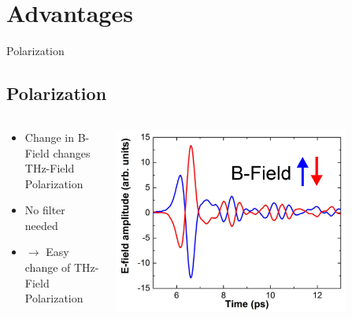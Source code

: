 \documentclass[aspectratio=1610, 9pt]{beamer}
\begin{document}
\section{Advantages}
\begin{frame}{Polarization}
  \subsection{Polarization}
  \begin{columns}
    \begin{column}{0.3\textwidth}
    \begin{itemize}
      \item Change in B-Field changes THz-Field Polarization
      \vspace{0.3in}
      \item No filter needed
      \vspace{0.3in}
      \item $\rightarrow$ Easy change of THz-Field Polarization
    \end{itemize}
    \end{column}
  \begin{column}{.7\textwidth}
  \begin{center}
    \includegraphics[width=0.8\textwidth]{pics/Bfeld.png}
  \end{center}
  \end{column}
  \end{columns}
\end{frame}
\end{document}

